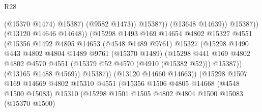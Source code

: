 \begin{lexlean}{R28}
\begin{coremodule}
                                              (@15370 @1474)
                                              @15387)
                                            (@9582 @1473))
                                          @15387))
                                      (@13648 @14639))
                                    @15387))
                                (@13120 @14646 @14648))
                              (@15298
                                @1493
                                @169
                                @14654
                                @4802
                                @15327
                                @4551
                                (@15356
                                  @1492
                                  @4805
                                  @14653
                                  (@4548 @1489 @9761)
                                  @15327
                                  (@15298
                                    @1490
                                    @443
                                    @4802
                                    @4804
                                    @1489
                                    @9761
                                    (@15370 @1489)
                                    (@15298
                                      @441
                                      @169
                                      @4802
                                      @4802
                                      @4570
                                      @4551
                                      (@15379 @52 @4570 (@4910 (@15382 @52)))
                                      @15387))
                                  (@13165 @1488 @4569))
                                @15387))
                            (@13120 @14660 @14663))
                          (@15298
                            @1507
                            @169
                            @14669
                            @4802
                            @15310
                            @4551
                            (@15356
                              @1506
                              @4805
                              @14668
                              (@4548 @1500 @15083)
                              @15310
                              (@15298
                                @1501
                                @1505
                                @4802
                                @4804
                                @1500
                                @15083
                                (@15370 @1500)

\end{coremodule}
\end{lexlean}
